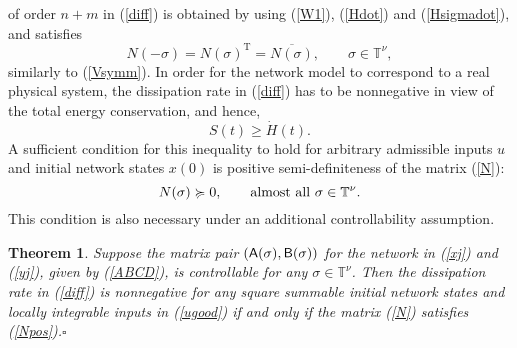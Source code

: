 \documentclass[letterpaper, 10pt, conference]{ieeeconf}  %
\newtheorem{thm}{Theorem}
\def\>{\geqslant}           %
\def\rT{\mathrm{T}}        %
\def\sA{\mathsf{A}}
\def\sB{\mathsf{B}}
\def\sC{\mathsf{C}}
\def\sD{\mathsf{D}}
\def\sV{\mathsf{V}}
\def\sG{\mathsf{G}}
\def\sB{{\sf B}}
\def\sC{{\sf C}}
\def\mT{\mathbb{T}}
\begin{document}
of order $n+m$ in (\ref{diff}) is obtained by using (\ref{W1}), (\ref{Hdot}) and (\ref{Hsigmadot}),
and satisfies
\begin{equation}
\label{Nsymm}
  N(-\sigma)
  =
  N(\sigma)^{\rT}
  =
  \overline{N(\sigma)},
  \qquad
  \sigma \in \mT^\nu,
\end{equation}
similarly to (\ref{Vsymm}).
In order for the network model to correspond to a real physical system, the dissipation rate in (\ref{diff}) has to be nonnegative in view of the total energy conservation, and hence,
\begin{equation}
\label{diss}
    S(t) \> \dot{H}(t).
\end{equation}
A sufficient condition for this inequality to hold  for arbitrary admissible inputs $u$ and  initial network states $x(0)$ is positive semi-definiteness of the matrix (\ref{N}):
\begin{equation}
\label{Npos}
  N(\sigma) \succcurlyeq 0,
  \qquad
  {\rm almost\ all}\
  \sigma \in \mT^\nu.
\end{equation}
This condition is also necessary under an additional controllability assumption.
\begin{thm}
\label{th:Npos}
Suppose the matrix pair $(\sA(\sigma), \sB(\sigma))$ for the network in (\ref{xj}) and (\ref{yj}), given by (\ref{ABCD}), is controllable for any $\sigma\in \mT^\nu$. Then the dissipation rate in (\ref{diff}) is nonnegative for any square summable initial network states and locally integrable inputs in (\ref{ugood}) if and only if the matrix (\ref{N}) satisfies (\ref{Npos}).\hfill$\square$
\end{thm}
\end{document}
